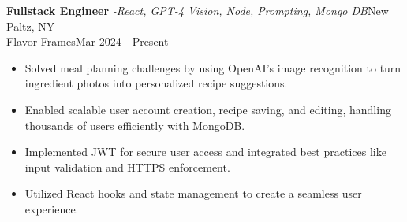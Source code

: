 \documentclass[a4paper]{article}
\begin{document}

\vspace*{-1.5mm}

\textbf{Fullstack Engineer} \hspace{1mm} {\sl -React, GPT-4 Vision, Node, Prompting, Mongo DB}\hfill New Paltz, NY\\
Flavor Frames\hfill Mar 2024 - Present\\

\vspace{-2mm}
\begin{itemize}[leftmargin=0.5cm]
\setlength\itemsep{-2mm}
    \item Solved meal planning challenges by using OpenAI's image recognition to turn ingredient photos into personalized recipe suggestions.
    \item Enabled scalable user account creation, recipe saving, and editing, handling thousands of users efficiently with MongoDB.
    \item Implemented JWT for secure user access and integrated best practices like input validation and HTTPS enforcement.
    \item Utilized React hooks and state management to create a seamless user experience.
\end{itemize}

\vspace{-0.5mm}
\end{document}
